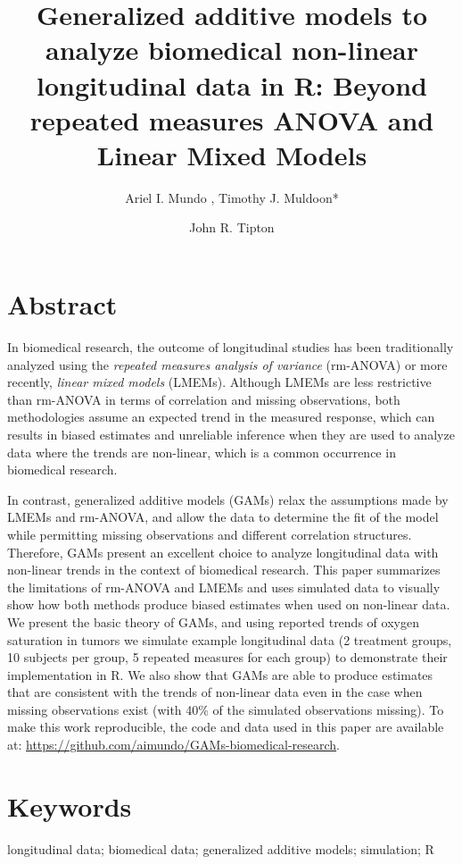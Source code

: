\documentclass[
]{article}
\title{\textbf{Generalized additive models to analyze biomedical non-linear longitudinal data in R: Beyond repeated measures ANOVA and Linear Mixed Models}}
\date{\vspace{-2.5em}}
\author{Ariel I. Mundo \orcidaffila{}, Timothy J. Muldoon*}
\affil{Department of Biomedical Engineering, University of Arkansas, Fayetteville, AR, USA}
\affil{\normalfont {tmuldoon@uark.edu}}
\author{John R. Tipton \orcidaffilb{}}
\affil{Department of Mathematical Sciences, University of Arkansas, Fayetteville, AR, USA}
\begin{document}
\maketitle

\hypertarget{abstract}{%
\section{Abstract}\label{abstract}}

In biomedical research, the outcome of longitudinal studies has been traditionally analyzed using the \emph{repeated measures analysis of variance} (rm-ANOVA) or more recently, \emph{linear mixed models} (LMEMs). Although LMEMs are less restrictive than rm-ANOVA in terms of correlation and missing observations, both methodologies assume an expected trend in the measured response, which can results in biased estimates and unreliable inference when they are used to analyze data where the trends are non-linear, which is a common occurrence in biomedical research.

In contrast, generalized additive models (GAMs) relax the assumptions made by LMEMs and rm-ANOVA, and allow the data to determine the fit of the model while permitting missing observations and different correlation structures. Therefore, GAMs present an excellent choice to analyze longitudinal data with non-linear trends in the context of biomedical research. This paper summarizes the limitations of rm-ANOVA and LMEMs and uses simulated data to visually show how both methods produce biased estimates when used on non-linear data. We present the basic theory of GAMs, and using reported trends of oxygen saturation in tumors we simulate example longitudinal data (2 treatment groups, 10 subjects per group, 5 repeated measures for each group) to demonstrate their implementation in R. We also show that GAMs are able to produce estimates that are consistent with the trends of non-linear data even in the case when missing observations exist (with 40\% of the simulated observations missing). To make this work reproducible, the code and data used in this paper are available at: \url{https://github.com/aimundo/GAMs-biomedical-research}.

\hypertarget{keywords}{%
\section*{Keywords}\label{keywords}}

longitudinal data; biomedical data; generalized additive models; simulation; R
\end{document}
